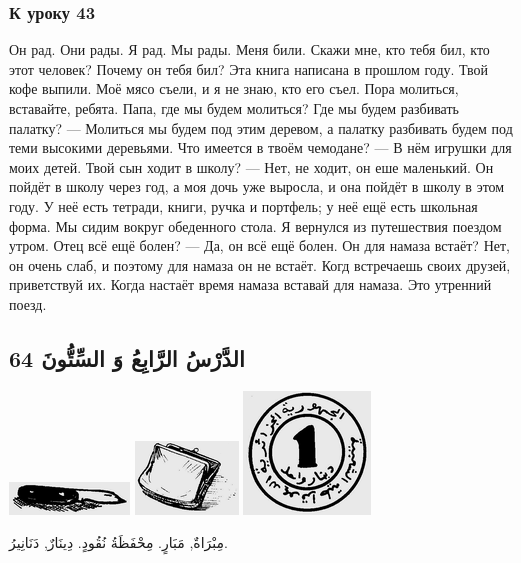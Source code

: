 \documentclass[a5paper]{article}
\begin{document}
\subsubsection{К уроку 43}
Он рад. Они рады. Я рад. Мы рады. Меня били. Скажи мне, кто тебя бил, кто этот человек? Почему он тебя бил? Эта книга написана в прошлом году. Твой кофе выпили. Моё мясо съели, и я не знаю, кто его съел. Пора молиться, вставайте, ребята. Папа, где мы будем молиться? Где мы будем разбивать палатку? — Молиться мы будем под этим деревом, а палатку разбивать будем под теми высокими деревьями. Что имеется в твоём чемодане? — В нём игрушки для моих детей. Твой сын ходит в школу? — Нет, не ходит, он еше маленький. Он пойдёт в школу через год, а моя дочь уже выросла, и она пойдёт в школу в этом году. У неё есть тетради, книги, ручка и портфель; у неё ещё есть школьная форма. Мы сидим вокруг обеденного стола. Я вернулся из путешествия поездом утром. Отец всё ещё болен? — Да, он всё ещё болен. Он для намаза встаёт? Нет, он очень слаб, и поэтому для намаза он не встаёт. Когд встречаешь своих друзей, приветствуй их. Когда настаёт время намаза вставай для намаза. Это утренний поезд.

\subsection{الدَّرْسُ الرَّابِعُ وَ السِّتُّونَ 64}
 \includegraphics[width=1.2602in,height=0.3437in]{MuhammadBagauddinlatinized-img213.png}   \includegraphics[width=1.0835in,height=0.7709in]{MuhammadBagauddinlatinized-img214.png}   \includegraphics[width=1.3335in,height=1.2917in]{MuhammadBagauddinlatinized-img215.png} 

مِبْرَاةٌ, مَبَارٍ. مِحْفَظَةُ نُقُودٍ. دِينَارٌ, دَنَانِيرُ. 
\end{document}
